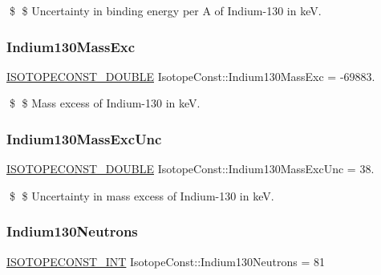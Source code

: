\$ \$ Uncertainty in binding energy per A of Indium-\/130 in keV. \mbox{\label{group___isotope_const-_indium-_in130_gab2e18e6484a006fc617373a7bcb777a6}} 
\subsubsection{\texorpdfstring{Indium130\+Mass\+Exc}{Indium130MassExc}}
{\footnotesize\ttfamily \mbox{\hyperlink{group___isotope_const-_macros_ga8f45a7272ce02c0b4c65c44636ed719a}{I\+S\+O\+T\+O\+P\+E\+C\+O\+N\+S\+T\+\_\+\+D\+O\+U\+B\+LE}} Isotope\+Const\+::\+Indium130\+Mass\+Exc = -\/69883.}

\$ \$ Mass excess of Indium-\/130 in keV. \mbox{\label{group___isotope_const-_indium-_in130_ga210ea4cd61dcca1ab42acc8835e706b7}} 
\subsubsection{\texorpdfstring{Indium130\+Mass\+Exc\+Unc}{Indium130MassExcUnc}}
{\footnotesize\ttfamily \mbox{\hyperlink{group___isotope_const-_macros_ga8f45a7272ce02c0b4c65c44636ed719a}{I\+S\+O\+T\+O\+P\+E\+C\+O\+N\+S\+T\+\_\+\+D\+O\+U\+B\+LE}} Isotope\+Const\+::\+Indium130\+Mass\+Exc\+Unc = 38.}

\$ \$ Uncertainty in mass excess of Indium-\/130 in keV. \mbox{\label{group___isotope_const-_indium-_in130_gaeda16b436b3a54e23e7010c0f062b6ef}} 
\subsubsection{\texorpdfstring{Indium130\+Neutrons}{Indium130Neutrons}}
{\footnotesize\ttfamily \mbox{\hyperlink{group___isotope_const-_macros_ga5f18360b3e99483a35c32d789e62621c}{I\+S\+O\+T\+O\+P\+E\+C\+O\+N\+S\+T\+\_\+\+I\+NT}} Isotope\+Const\+::\+Indium130\+Neutrons = 81}

